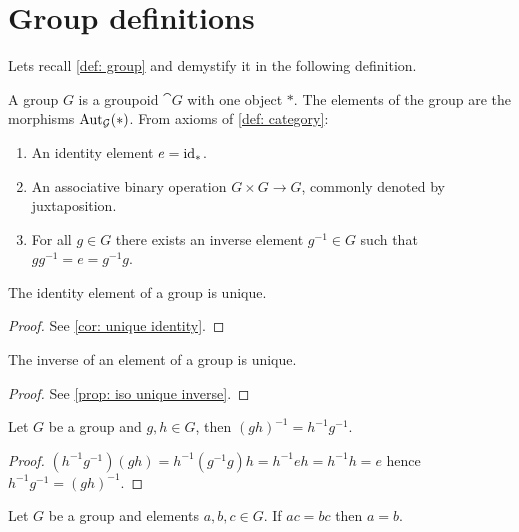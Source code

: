 \section{Group definitions}

Lets recall \cref{def: group} and demystify it in the following definition.

\begin{definition}[Group]
  A group \(G\) is a groupoid \(\cat G\) with one object \(*\). The elements of
  the group are the morphisms \(\operatorname{Aut}_{\mathcal G}(*)\). From axioms of \cref{def:
  category}:
  \begin{enumerate}[(G1)]
    \item An identity element \(e = \operatorname{id}_*\).
    \item An associative binary operation \(G \times G \to G\), commonly denoted
      by juxtaposition.
    \item For all \(g \in G\) there exists an inverse element \(g^{-1} \in G\)
      such that \(g g^{-1} = e = g^{-1} g\).
  \end{enumerate}
\end{definition}

\begin{proposition}
  The identity element of a group is unique.
\end{proposition}

\begin{proof}
  See \cref{cor: unique identity}.
\end{proof}

\begin{proposition}
  The inverse of an element of a group is unique.
\end{proposition}

\begin{proof}
  See \cref{prop: iso unique inverse}.
\end{proof}

\begin{proposition}
  Let \(G\) be a group and \(g, h \in G\), then \((g h)^{-1} = h^{-1} g^{-1}\).
\end{proposition}

\begin{proof}
  \((h^{-1} g^{-1})(g h) = h^{-1} (g^{-1} g) h = h^{-1} e h = h^{-1} h = e\)
  hence \(h^{-1} g^{-1} = (g h)^{-1}\).
\end{proof}

\begin{proposition}[Cancellation]
  Let \(G\) be a group and elements \(a, b, c \in G\). If \(a c = b c\) then
  \(a = b\).
\end{proposition}

